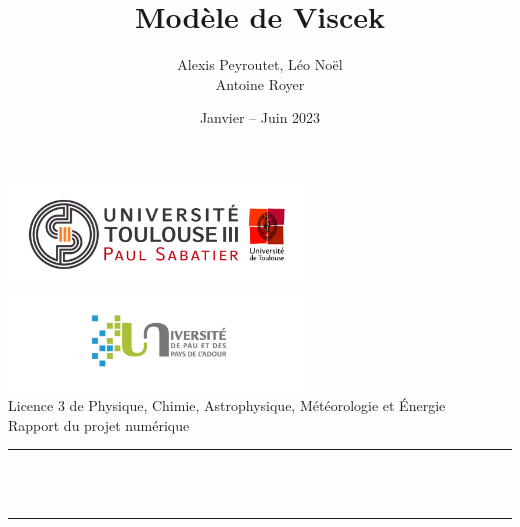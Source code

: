 \documentclass[french, a4paper, 12pt, openany]{book}
\title{Modèle de Viscek}
\author{Alexis Peyroutet, Léo Noël\\Antoine Royer}
\date{Janvier – Juin 2023}
\begin{document}
\makeatletter
\begin{titlepage}
	\centering
	
	\includegraphics[width=8cm]{images/ut3.png} \hfill \includegraphics[width=8cm]{images/uppa.png} \\
	{\large{\sc Licence 3 de Physique, Chimie, Astrophysique, Météorologie et Énergie}} \\
	{\sc Rapport du projet numérique}\\
	
	\rule{\linewidth}{0.4pt}
	
	\vfill
	{\huge {\sc \@title}}\\
	\vspace{1cm}
	{\Large \@author \\ \@date}
	
	\vfill \vfill
	\rule{\linewidth}{0.4pt}
\end{titlepage}
\makeatother

\tableofcontents
{}
\end{document}

